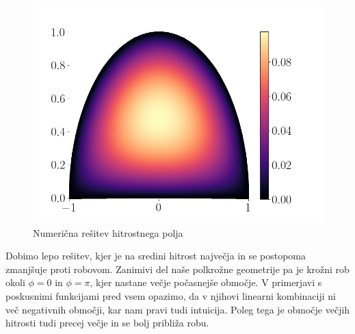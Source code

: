 \documentclass{article}
\begin{document}
\begin{figure}[H]
	\centering
	\includegraphics[width=0.6\linewidth]{pretok.png}
	\caption{Numerična rešitev hitrostnega polja}
\end{figure}
Dobimo lepo rešitev, kjer je na sredini hitrost največja in se postopoma zmanjšuje proti robovom. Zanimivi del naše polkrožne geometrije pa je krožni rob okoli $\phi=0$ in $\phi=\pi$, kjer nastane večje počasnejše območje. V primerjavi s poskusnimi funkcijami pred vsem opazimo, da v njihovi linearni kombinaciji ni več negativnih območji, kar nam pravi tudi intuicija. Poleg tega je območje večjih hitrosti tudi precej večje in se bolj približa robu. 

\smallskip
\end{document}
